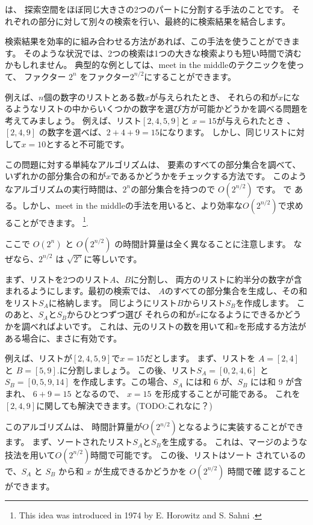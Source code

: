 
は、
探索空間をほぼ同じ大きさの2つのパートに分割する手法のことです。
それぞれの部分に対して別々の検索を行い、最終的に検索結果を結合します。

検索結果を効率的に組み合わせる方法があれば、この手法を使うことができます。
そのような状況では、2つの検索は1つの大きな検索よりも短い時間で済むかもしれません。
典型的な例としては、meet in the middleのテクニックを使って、
ファクター $2^n$ をファクター$2^{n/2}$にすることができます。

例えば、$n$個の数字のリストとある数$x$が与えられたとき、
それらの和が$x$になるようなリストの中からいくつかの数字を選び方が可能かどうかを調べる問題を考えてみましょう。
例えば、リスト$[2,4,5,9]$と $x = 15$が与えられたとき 、
$[2,4,9]$ の数字を選べば、$2+4+9=15$になります。
しかし、同じリストに対して$x=10$とすると不可能です。

この問題に対する単純なアルゴリズムは、
要素のすべての部分集合を調べて、
いずれかの部分集合の和が$x$であるかどうかをチェックする方法です。
このようなアルゴリズムの実行時間は、$2^n$の部分集合を持つので
$O(2^{n/2})$ です。
で ある。しかし、meet in the middleの手法を用いると、より効率な$O(2^{n/2})$で求めることができます。
\footnote{This
idea was introduced in 1974 by E. Horowitz and S. Sahni \cite{hor74}.}.

ここで $O(2^n)$ と $O(2^{n/2})$ の時間計算量は全く異なることに注意します。
なぜなら、$2^{n/2}$ は $\sqrt{2^n}$に等しいです。

まず、リストを2つのリスト$A$、$B$に分割し、
両方のリストに約半分の数字が含まれるようにします。最初の検索では、
$A$のすべての部分集合を生成し、その和をリスト$S_A$に格納します。
同じようにリスト$B$からリスト$S_B$を作成します。
このあと、$S_A$と$S_B$からひとつずつ選び
それらの和が$x$になるようにできるかどうかを調べればよいです。
これは、元のリストの数を用いて和$x$を形成する方法がある場合に、まさに有効です。

例えば、リストが$[2,4,5,9]$で$x=15$だとします。
まず、リストを $A=[2,4]$ と $B=[5,9]$.に分割しましょう。
この後、リスト$S_A=[0,2,4,6]$ と $S_B=[0,5,9,14]$
を作成します。この場合、$S_A$ には和 $6$ が、$S_B$ には和 9 が含まれ、
$6 + 9 = 15$ となるので、
$x = 15$ を形成することが可能である。
これを$[2,4,9]$に関しても解決できます。(TODO:これなに？)

このアルゴリズムは、
時間計算量が$O(2^{n/2})$となるように実装することができます。
まず、ソートされたリスト$S_A$と$S_B$を生成する。
これは、マージのような技法を用いて$O(2^{n/2})$時間で可能です。
この後、リストはソート されているので、$S_A$ と $S_B$ から和 $x$ が生成できるかどうかを $O(2^{n/2})$ 時間で確 認することができます。